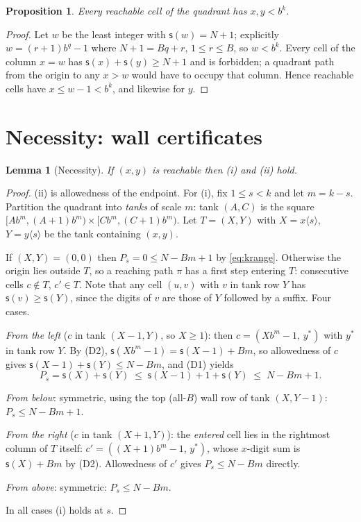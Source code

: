 \documentclass[11pt]{article}
\newtheorem{lemma}[theorem]{Lemma}
\newtheorem{proposition}[theorem]{Proposition}
\theoremstyle{remark}
\newcommand{\ds}{\mathsf{s}}
\newcommand{\pref}[2]{#1\langle #2\rangle}
\begin{document}
\begin{proposition}\label{prop:box}
Every reachable cell of the quadrant has $x,y<b^k$.
\end{proposition}

\begin{proof}
Let $w$ be the least integer with $\ds(w)=N+1$; explicitly $w=(r+1)b^{q}-1$ where
$N+1=Bq+r$, $1\le r\le B$, so $w<b^{k}$. Every cell of the column $x=w$ has
$\ds(x)+\ds(y)\ge N+1$ and is forbidden; a quadrant path from the origin to any
$x>w$ would have to occupy that column. Hence reachable cells have $x\le w-1<b^k$,
and likewise for $y$.
\end{proof}

\section{Necessity: wall certificates}

\begin{lemma}[Necessity]\label{lem:nec}
If $(x,y)$ is reachable then \textup{(i)} and \textup{(ii)} hold.
\end{lemma}

\begin{proof}
(ii) is allowedness of the endpoint. For (i), fix $1\le s<k$ and let $m=k-s$.
Partition the quadrant into \emph{tanks} of scale $m$: tank $(A,C)$ is the square
$[A b^m,(A{+}1)b^m)\times[C b^m,(C{+}1)b^m)$. Let $T=(X,Y)$ with $X=\pref{x}{s}$,
$Y=\pref{y}{s}$ be the tank containing $(x,y)$.

If $(X,Y)=(0,0)$ then $P_s=0\le N-Bm+1$ by \eqref{eq:krange}. Otherwise the origin
lies outside $T$, so a reaching path $\pi$ has a first step entering $T$: consecutive
cells $c\notin T$, $c'\in T$. Note that any cell $(u,v)$ with $v$ in tank row $Y$ has
$\ds(v)\ge\ds(Y)$, since the digits of $v$ are those of $Y$ followed by a suffix.
Four cases.

\emph{From the left} ($c$ in tank $(X{-}1,Y)$, so $X\ge1$): then
$c=(Xb^m-1,\,y^*)$ with $y^*$ in tank row $Y$. By (D2),
$\ds(Xb^m-1)=\ds(X{-}1)+Bm$, so allowedness of $c$ gives
$\ds(X{-}1)+\ds(Y)\le N-Bm$, and (D1) yields
\[
P_s=\ds(X)+\ds(Y)\;\le\;\ds(X-1)+1+\ds(Y)\;\le\;N-Bm+1 .
\]

\emph{From below}: symmetric, using the top (all-$B$) wall row of tank
$(X,Y{-}1)$: $P_s\le N-Bm+1$.

\emph{From the right} ($c$ in tank $(X{+}1,Y)$): the \emph{entered} cell lies in
the rightmost column of $T$ itself: $c'=((X{+}1)b^m-1,\,y^*)$, whose $x$-digit sum
is $\ds(X)+Bm$ by (D2). Allowedness of $c'$ gives $P_s\le N-Bm$ directly.

\emph{From above}: symmetric: $P_s\le N-Bm$.

In all cases (i) holds at $s$.
\end{proof}
\end{document}
